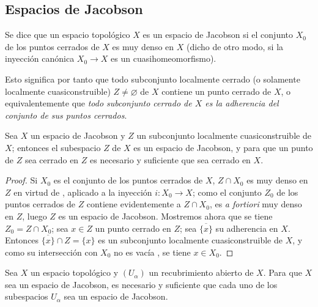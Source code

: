 \subsection{Espacios de Jacobson}
\label{subsection:IV.10.3}


\begin{definition}[10.3.1]
\label{IV.10.3.1}
Se dice que un espacio topológico $X$ es un espacio de Jacobson si el conjunto $X_0$ de los puntos cerrados de $X$ es muy denso en $X$ \textup{(dicho de otro modo, si la inyección canónica $X_0\to X$ es un }cuasihomeomorfismo\textup{)}.
\end{definition}

Esto significa por tanto  que todo subconjunto localmente cerrado (o solamente localmente cuasiconstruible) $Z\neq\varnothing$ de $X$ contiene un punto cerrado de $X$, o equivalentemente que \emph{todo subconjunto cerrado de $X$ es la adherencia del conjunto de sus puntos cerrados}.

\begin{proposition}[10.3.2]
\label{IV.10.3.2}
Sea $X$ un espacio de Jacobson y $Z$ un subconjunto localmente cuasiconstruible de $X$; entonces el subespacio $Z$ de $X$ es un espacio de Jacobson, y para que un punto de $Z$ sea cerrado en $Z$ es necesario y suficiente que sea cerrado en $X$.
\end{proposition}

\begin{proof}
Si $X_0$ es el conjunto de los puntos cerrados de $X$, $Z\cap X_0$ es muy denso en $Z$ en virtud de , aplicado a la inyección $i:X_0\to X$; como el conjunto $Z_0$ de los puntos cerrados de $Z$ contiene evidentemente a $Z\cap X_0$, es \emph{a fortiori} muy denso en $Z$, luego $Z$ es un espacio de Jacobson.
Mostremos ahora que se tiene $Z_0=Z\cap X_0$; sea $x\in Z$ un punto cerrado en $Z$; sea $\overline{\{x\}}$ su adherencia en $X$. Entonces $\overline{\{x\}}\cap Z=\{x\}$ es un subconjunto localmente cuasiconstruible de $X$, y como su intersección con $X_0$ no es vacía , se tiene $x\in X_0$.
\end{proof}

\begin{proposition}[10.3.3]
\label{IV.10.3.3}
Sea $X$ un espacio topológico y $(U_\alpha)$ un recubrimiento abierto de $X$.
Para que $X$ sea un espacio de Jacobson, es necesario y suficiente que cada uno de los subespacios $U_\alpha$ sea un espacio de Jacobson.
\end{proposition}

